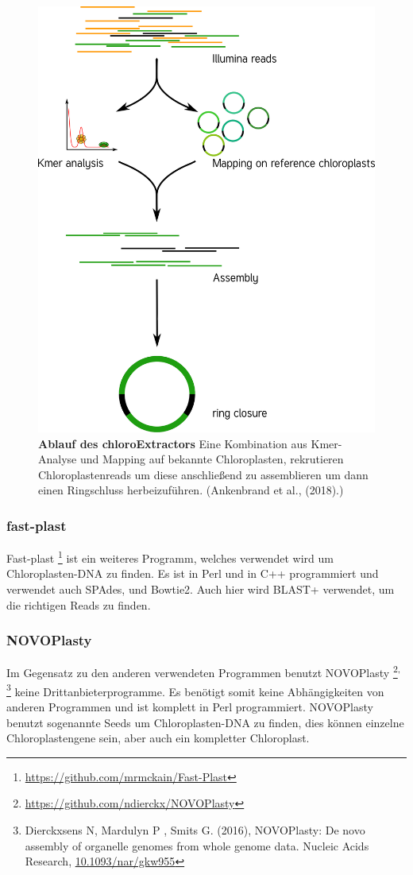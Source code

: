 \documentclass{scrartcl}
\begin{document}
\begin{figure}
\includegraphics[width=.9\linewidth]{./workflow.png}
\caption[Ablauf des chloroExtractors]{\textbf{Ablauf des chloroExtractors} Eine Kombination aus Kmer-Analyse und Mapping auf bekannte Chloroplasten, rekrutieren Chloroplastenreads um diese anschließend zu assemblieren um dann einen Ringschluss herbeizuführen. (Ankenbrand et al., (2018).)}
\end{figure}

\subsubsection{fast-plast}
\label{sec-2-5-2}
Fast-plast  \footnote{\url{https://github.com/mrmckain/Fast-Plast}} ist ein weiteres Programm, welches verwendet wird um Chloroplasten-DNA zu finden. Es ist in Perl und in C++ programmiert und verwendet auch SPAdes, 
und Bowtie2\footnotemark[21]{}. Auch hier wird BLAST+\footnotemark[24]{} verwendet, um die richtigen Reads zu finden. 
\subsubsection{NOVOPlasty}
\label{sec-2-5-3}
Im Gegensatz zu den anderen verwendeten Programmen benutzt NOVOPlasty \footnote{\url{https://github.com/ndierckx/NOVOPlasty}}\textsuperscript{,}\,\footnote{Dierckxsens N, Mardulyn P , Smits G. (2016), NOVOPlasty: De novo assembly of organelle genomes from whole genome data. Nucleic Acids Research, \url{10.1093/nar/gkw955}} keine Drittanbieterprogramme. Es benötigt somit keine Abhängigkeiten von anderen Programmen
und ist komplett in Perl programmiert. NOVOPlasty benutzt sogenannte Seeds um Chloroplasten-DNA zu finden, dies können einzelne Chloroplastengene sein, aber auch ein kompletter Chloroplast.
\end{document}
